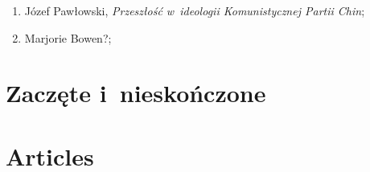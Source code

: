\documentclass[a4paper,11pt]{article}
\begin{document}
\begin{enumerate}
\item Józef Pawłowski, \textit{Przeszłość w~ideologii Komunistycznej Partii
    Chin};

\item Marjorie Bowen?;































\end{enumerate}










\newpage
\section{Zaczęte i~nieskończone}

\vspace{\spaceTwo}














\newpage
\section{Articles}

\vspace{\spaceTwo}
\end{document}
